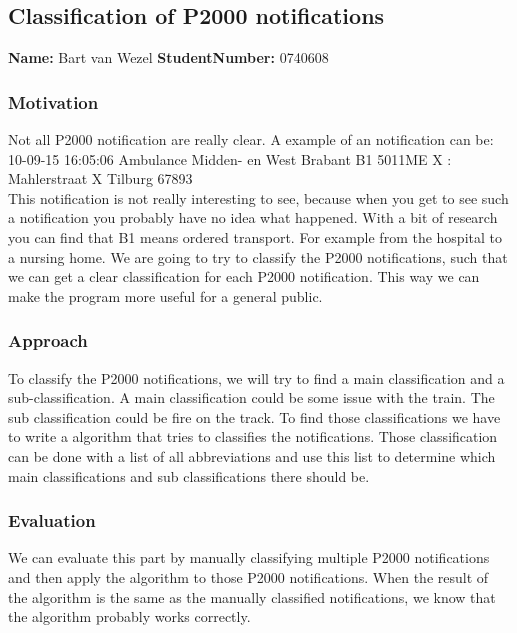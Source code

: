\subsection{Classification of P2000 notifications }
\textbf{Name:} Bart van Wezel \indent \textbf{StudentNumber:} 0740608

\subsubsection*{Motivation}
Not all P2000 notification are really clear. A example of an notification can be: \\ 
10-09-15	16:05:06	Ambulance	Midden- en West Brabant	B1 5011ME X : Mahlerstraat X Tilburg 67893  \\
This notification is not really interesting to see, because when you get to see such a notification you probably have no idea what happened. 
With a bit of research you can find that B1 means ordered transport. For example from the hospital to a nursing home. 
We are going to try to classify the P2000 notifications, such that we can get a clear classification for each P2000 notification.
This way we can make the program more useful for a general public. 

\subsubsection*{Approach}
To classify the P2000 notifications, we will try to find a main classification and a sub-classification. 
A main classification could be some issue with the train. 
The sub classification could be fire on the track. 
To find those classifications we have to write a algorithm that tries to classifies the notifications. 
Those classification can be done with a list of all abbreviations and use this list to determine which main classifications and sub classifications there should be. 

\subsubsection*{Evaluation }
We can evaluate this part by manually classifying  multiple P2000 notifications and then apply the algorithm to those P2000 notifications.
When the result of the algorithm is the same as the manually classified notifications, we know that the algorithm probably works correctly.